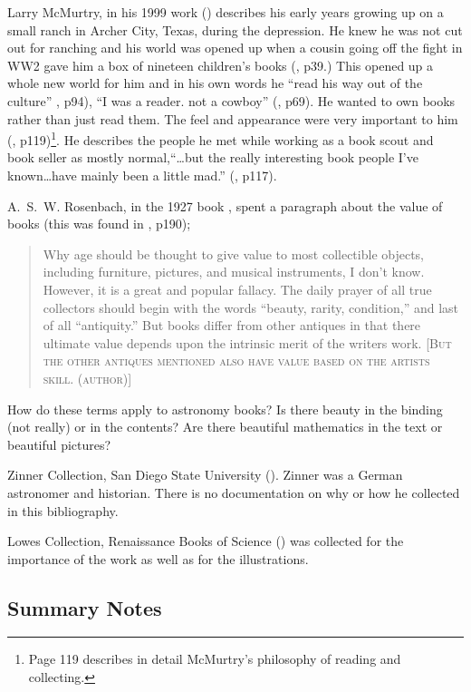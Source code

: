 \documentclass[letterpaper]{article}
\begin{document}
Larry McMurtry, in his 1999 work  (\cite{McMurtry1999}) describes his early years growing up on
a small ranch in Archer City, Texas, during the depression.  He knew
he was not cut out for ranching and his world was opened up when a
cousin going off the fight in WW2 gave him a box of nineteen
children's books (\cite{McMurtry1999}, p39.) This opened up a whole
new world for him and in his own words he ``read his way out of the
culture'' \cite{McMurtry1999}, p94), ``I was a reader. not a cowboy''
(\cite{McMurtry1999}, p69). He wanted to own books rather than just
read them. The feel and appearance were very important to him
(\cite{McMurtry1999}, p119)\footnote{Page 119 describes in detail
  McMurtry's philosophy of reading and collecting.}.  He describes the
people he met while working as a book scout and book seller as mostly
normal,``\ldots but the really interesting book people I've
known\ldots have mainly been a little mad.'' (\cite{McMurtry1999},
p117).

A.~S.~W. Rosenbach, in the 1927 book , spent a
paragraph about the value of books (this was found in
\cite{Kaplan2001}, p190);

\begin{quotation}
  Why age should be thought to give value to most collectible objects,
  including furniture, pictures, and musical instruments, I don't
  know.  However, it is a great and popular fallacy.  The daily prayer
  of all true collectors should begin with the words ``beauty, rarity,
  condition,'' and last of all ``antiquity.'' But books differ from
  other antiques in that there ultimate value depends upon the
  intrinsic merit of the writers work. [\textsc{But the other antiques
    mentioned also have value based on the artists skill. (author)}]
\end{quotation}

How do these terms apply to  astronomy books?  Is there beauty
in the binding (not really) or in the contents? Are there beautiful
mathematics in the text or beautiful pictures?

Zinner Collection, San Diego State University
(\cite{Kenny1988}). Zinner was a German astronomer and historian.
There is no documentation on why or how he collected in this
bibliography.

Lowes Collection, Renaissance Books of Science (\cite{Godine1970})
was collected for the importance of the work as well as for the
illustrations.

\subsection{Summary Notes}
\end{document}
